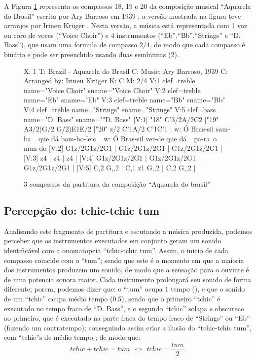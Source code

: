 A Figura \ref{fig:abc-caquarela} representa os compassos 18, 19 e 20 da  
composição musical ``Aquarela do Brasil'' escrita
por Ary Barroso em 1939 \cite{AquarelaDoBrasil}; 
a versão mostrada na figura teve arranjos por Irineu Krüger \cite{Irineu}. 
Nesta versão, a música está representada com 1 voz ou coro de voces (``Voice Choir'') e 4 
instrumentos (``Eb'',``Bb'',``Strings'' e ``D. Bass''), que usam uma 
formula de compasso $2/4$, de modo que cada compasso
é binário e
pode ser preenchido usando duas semínimas (2\quarternote).
\begin{figure}[ht]
\centering
\begin{abc}[name=abc-caquarela]
%
X: 1 %
T: Brazil - Aquarela do Brasil
C: Music: Ary Barroso, 1939
C: Arranged by: Irineu Krüger
K: C %
M: 2/4 %
%
V:1 clef=treble name="Voice Choir" sname="Voice Choir"
V:2 clef=treble name="Eb" sname="Eb"
V:3 clef=treble name="Bb" sname="Bb"
V:4 clef=treble name="Strings" sname="Strings"
V:5 clef=bass   name="D. Bass" sname=""D. Bass"
%
%
[V:1] "18" C'3/2A/2C2  |"19" A3/2(G/2 G/2)E1E/2  |"20" z/2 C'1A/2 C'1C'1  |
w:    Ó Bras-sil        sam-ba_ que dá       bam-bo-leio_ 
w:    Ó Bras-sil        ver-de que dá_       pa-ra~o mun-do 
%
%
[V:2] G1z/2G1z/2G1  | G1z/2G1z/2G1  | G1z/2G1z/2G1  |
%
%
[V:3] z4  | z4  | z4  |
%
%
[V:4] G1z/2G1z/2G1  | G1z/2G1z/2G1  | G1z/2G1z/2G1  |
%
%
[V:5] C,2 G,,2  | C,1 z1 G,,2  | C,2 G,,2  |
\end{abc}
\caption{3 compassos da partitura da composição ``Aquarela do brasil''}
\label{fig:abc-caquarela}
\end{figure}

\subsection{Percepção do: tchic-tchic tum}
Analisando este fragmento de partitura e escutando a música produzida, 
podemos perceber que os instrumentos executados em conjunto geram um sonido identificável
com a onomatopeia ``tchic-tchic tum''.
Assim, o inicio de cada compasso coincide com o ``tum''; 
sendo que este é o momento em que a maioria dos instrumentos produzem um sonido, 
de modo que a sensação para o ouvinte é de uma potencia sonora maior. 
Cada instrumento prolongará seu sonido de forma diferente; 
porem,  podemos dizer que: o ``tum'' ocupa $1$ tempo (\quarternote), 
e que o sonido de um ``tchic'' ocupa médio tempo (0.5\quarternote),
sendo que o primeiro ``tchic'' é executado no tempo fraco de ``D. Bass'', 
e o segundo ``tchic'' solapa e obscurece ao  primeiro, 
que é executado na parte fraca do tempo fraco de ``Strings'' ou ``Eb'' (fazendo um contratempo);
conseguindo assim criar a ilusão do ``tchic-tchic tum'', com ``tchic''s de médio tempo ; de modo que:
\begin{equation}
tchic + tchic = tum ~~ \Longleftrightarrow ~~ tchic = \frac{tum}{2}.
\end{equation}
 
